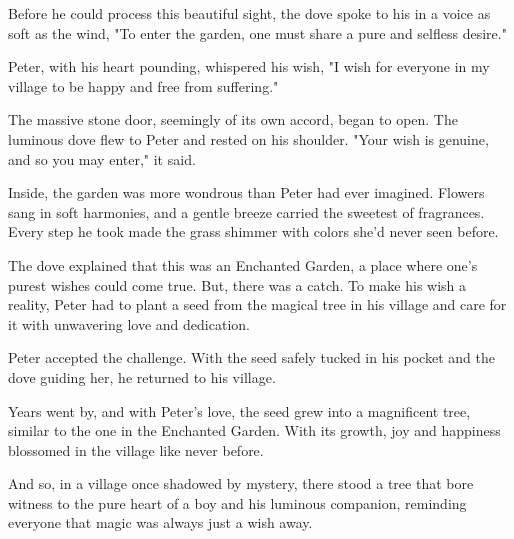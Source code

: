 \documentclass[10pt, a4paper, titlepage]{article}
\begin{document}
Before he could process this beautiful sight, the dove spoke to his in a voice as soft as the wind, "To enter the garden, one must share a pure and selfless desire."

Peter, with his heart pounding, whispered his wish, "I wish for everyone in my village to be happy and free from suffering."

The massive stone door, seemingly of its own accord, began to open. The luminous dove flew to Peter and rested on his shoulder. "Your wish is genuine, and so you may enter," it said.

Inside, the garden was more wondrous than Peter had ever imagined. Flowers sang in soft harmonies, and a gentle breeze carried the sweetest of fragrances. Every step he took made the grass shimmer with colors she'd never seen before.

The dove explained that this was an Enchanted Garden, a place where one’s purest wishes could come true. But, there was a catch. To make his wish a reality, Peter had to plant a seed from the magical tree in his village and care for it with unwavering love and dedication.

Peter accepted the challenge. With the seed safely tucked in his pocket and the dove guiding her, he returned to his village.

Years went by, and with Peter's love, the seed grew into a magnificent tree, similar to the one in the Enchanted Garden. With its growth, joy and happiness blossomed in the village like never before.

And so, in a village once shadowed by mystery, there stood a tree that bore witness to the pure heart of a boy and his luminous companion, reminding everyone that magic was always just a wish away.
\end{document}
